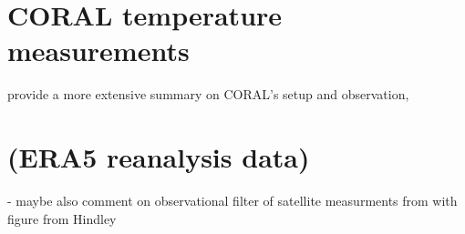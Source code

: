




\section{CORAL temperature measurements} 
\label{sec:coral}

\textcite{kaifler_compact_2021} provide a more extensive summary on CORAL's setup and observation,


\section{(ERA5 reanalysis data)}

- maybe also comment on observational filter of satellite measurments from with figure from Hindley